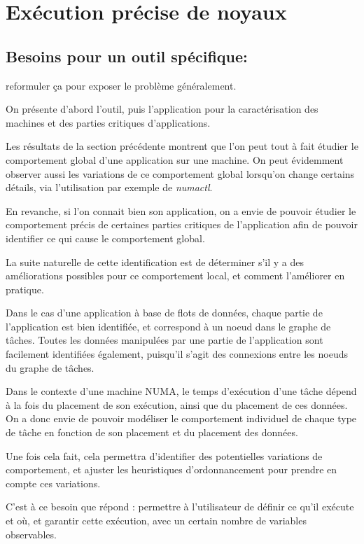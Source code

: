 \section{Exécution précise de noyaux}\label{sec:contribs:outil}

\subsection{Besoins pour un outil spécifique: \outil}

\begin{todo}
  reformuler ça pour exposer le problème généralement.

  On présente d'abord l'outil, puis l'application pour la caractérisation des machines et des parties critiques d'applications.
\end{todo}
Les résultats de la section précédente montrent que l'on peut tout à fait étudier le comportement global d'une application sur une machine. On peut évidemment observer aussi les variations de ce comportement global lorsqu'on change certains détails, via l'utilisation par exemple de \emph{numactl}.

En revanche, si l'on connait bien son application, on a envie de pouvoir étudier le comportement précis de certaines parties critiques de l'application afin de pouvoir identifier ce qui cause le comportement global.

La suite naturelle de cette identification est de déterminer s'il y a des améliorations possibles pour ce comportement local, et comment l'améliorer en pratique.

Dans le cas d'une application à base de flots de données, chaque partie de l'application est bien identifiée, et correspond à un noeud dans le graphe de tâches.
Toutes les données manipulées par une partie de l'application sont facilement identifiées également, puisqu'il s'agit des connexions entre les noeuds du graphe de tâches.

Dans le contexte d'une machine NUMA, le temps d'exécution d'une tâche dépend à la fois du placement de son exécution, ainsi que du placement de ces données. On a donc envie de pouvoir modéliser le comportement individuel de chaque type de tâche en fonction de son placement et du placement des données.

Une fois cela fait, cela permettra d'identifier des potentielles variations de comportement, et ajuster les heuristiques d'ordonnancement pour prendre en compte ces variations.

C'est à ce besoin que répond \outil : permettre à l'utilisateur de définir ce qu'il exécute et où, et garantir cette exécution, avec un certain nombre de variables observables.

